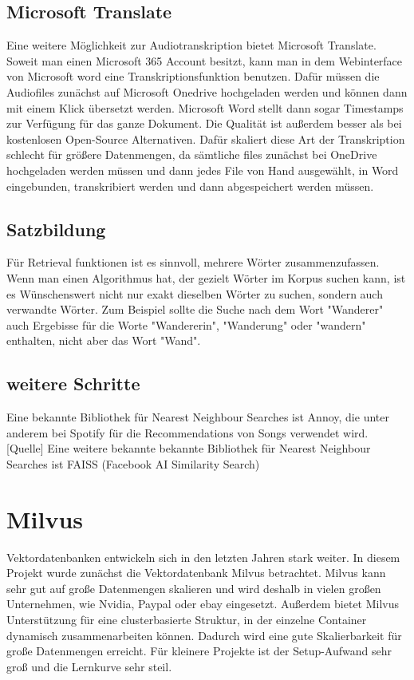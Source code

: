 \subsection{Microsoft Translate}

Eine weitere Möglichkeit zur Audiotranskription bietet Microsoft Translate. 
Soweit man einen Microsoft 365 Account besitzt, kann man in dem Webinterface von Microsoft word eine Transkriptionsfunktion benutzen. 
Dafür müssen die Audiofiles zunächst auf Microsoft Onedrive hochgeladen werden und können dann mit einem Klick übersetzt werden. 
Microsoft Word stellt dann sogar Timestamps  zur Verfügung für das ganze Dokument. 
Die Qualität ist außerdem besser als bei kostenlosen Open-Source Alternativen. 
Dafür skaliert diese Art der Transkription schlecht für größere Datenmengen, da sämtliche files zunächst bei OneDrive hochgeladen werden müssen und dann jedes File von Hand ausgewählt, in Word eingebunden, transkribiert werden und dann abgespeichert werden müssen. 

\subsection{Satzbildung}

Für Retrieval funktionen ist es sinnvoll, mehrere Wörter zusammenzufassen.
Wenn man einen Algorithmus hat, der gezielt Wörter im Korpus suchen kann, ist es Wünschenswert nicht nur exakt dieselben Wörter zu suchen, sondern auch verwandte Wörter.
Zum Beispiel sollte die Suche nach dem Wort "Wanderer" auch Ergebisse für die Worte "Wandererin", "Wanderung" oder "wandern" enthalten, nicht aber das Wort "Wand".


\subsection{weitere Schritte}


Eine bekannte Bibliothek für Nearest Neighbour Searches ist Annoy, die unter anderem bei Spotify für die Recommendations von Songs verwendet wird. [Quelle]
Eine weitere bekannte bekannte Bibliothek für Nearest Neighbour Searches ist FAISS (Facebook AI Similarity Search)

\section{Milvus}

Vektordatenbanken entwickeln sich in den letzten Jahren stark weiter.
In diesem Projekt wurde zunächst die Vektordatenbank Milvus betrachtet.
Milvus kann sehr gut auf große Datenmengen skalieren und wird deshalb in vielen großen Unternehmen, wie Nvidia, Paypal oder ebay eingesetzt. 
Außerdem bietet Milvus Unterstützung für eine clusterbasierte Struktur, in der einzelne Container dynamisch zusammenarbeiten können. 
Dadurch wird eine gute Skalierbarkeit für große Datenmengen erreicht. 
Für kleinere Projekte ist der Setup-Aufwand sehr groß und die Lernkurve sehr steil.

